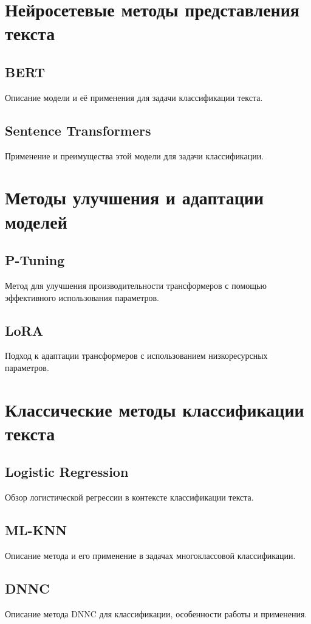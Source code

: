 \documentclass[14pt,a4paper,oneside,openany]{extbook}
\begin{document}
\section{Нейросетевые методы представления текста}
\label{sec:org72a4eba}
\subsection{BERT}
\label{sec:org3d1efd4}
Описание модели и её применения для задачи классификации текста. \autocite{reimers_sentencebert_2019,devlin_bert_2019,vaswani_attention_2017}
\subsection{Sentence Transformers}
\label{sec:org2e422e7}
Применение и преимущества этой модели для задачи классификации.
\section{Методы улучшения и адаптации моделей}
\label{sec:org481cf2b}
\subsection{P-Tuning}
\label{sec:org4ceb574}
Метод для улучшения производительности трансформеров с помощью эффективного использования параметров. \autocite{han_parameterefficient_2024}
\subsection{LoRA}
\label{sec:org9b7a550}
Подход к адаптации трансформеров с использованием низкоресурсных параметров. \autocite{hu_lora_2021}
\section{Классические методы классификации текста}
\label{sec:orgc997735}
\subsection{Logistic Regression}
\label{sec:org4859f34}
Обзор логистической регрессии в контексте классификации текста.
\subsection{ML-KNN}
\label{sec:org7147ac7}
Описание метода и его применение в задачах многоклассовой классификации. \autocite{zhang_mlknn_2007}
\subsection{DNNC}
\label{sec:org17241e5}
Описание метода DNNC для классификации, особенности работы и применения. \autocite{zhang_discriminative_2020}
\end{document}
